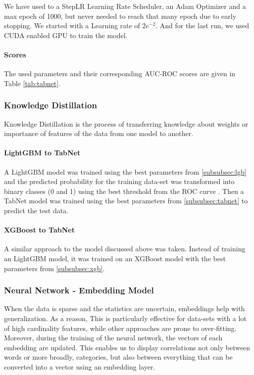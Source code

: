 \documentclass[sigconf, nonacm]{acmart}
\begin{document}
We have used to a StepLR Learning Rate Scheduler, an Adam Optimizer and a max epoch of 1000, but never needed to reach that many epoch due to early stopping. We started with a Learning rate of $2e^{-2}$. And for the last run, we used CUDA enabled GPU to train the model.

\paragraph{Scores}
The used parameters and their corresponding AUC-ROC scores are given in Table \ref{tab:tabnet}.

\subsubsection{Knowledge Distillation}

Knowledge Distillation is the process of transferring knowledge about weights or importance of features of the data from one model to another.

\paragraph{LightGBM to TabNet}
A LightGBM model was trained using the best parameters from \ref{subsubsec:lgb} and the predicted probability for the training data-set was transformed into binary classes (0 and 1) using the best threshold from the ROC curve \cite{narkhede2018understanding}. Then a TabNet model was trained using the best parameters from \ref{subsubsec:tabnet} to predict the test data.

\paragraph{XGBoost to TabNet}
A similar approach to the model discussed above was taken. Instead of training an LightGBM model, it was trained on an XGBoost model with the best parameters from \ref{subsubsec:xgb}.


\subsubsection{Neural Network - Embedding Model\cite{gomes_2021}}
When the data is sparse and the statistics are uncertain, embeddings help with generalization. As a reason, This is particularly effective for data-sets with a lot of high cardinality features, while other approaches are prone to over-fitting. Moreover, during the training of the neural network, the vectors of each embedding are updated. This enables us to display correlations not only between words or more broadly, categories, but also between everything that can be converted into a vector using an embedding layer.
\end{document}
